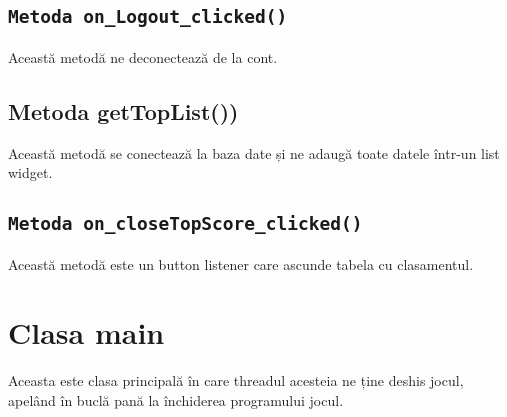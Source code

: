 \documentclass{article}
\begin{document}
\subsection{\texttt{Metoda on\_Logout\_clicked()}}
Această metodă ne deconectează de la cont.

\subsection{Metoda getTopList())}
Această metodă se conectează la baza date și ne adaugă toate datele într-un  list widget.

\subsection{\texttt{Metoda on\_closeTopScore\_clicked()}}   
Această metodă este un button listener care ascunde tabela cu clasamentul.

\section{Clasa main}
Aceasta este clasa principală în care threadul acesteia ne ține deshis jocul, apelând în buclă pană la închiderea  programului jocul.
\end{document}
